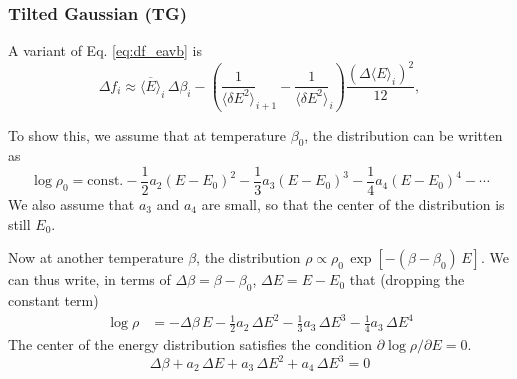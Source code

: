 \documentclass[aip,jcp,preprint,notitlepage, superscriptaddress]{revtex4-1}
\begin{document}
\subsubsection{Tilted Gaussian (TG)}



A variant of Eq. \eqref{eq:df_eavb} is
\begin{equation}
\Delta f_i
\approx
\overline{ \langle E \rangle }_i \, \Delta \beta_i
-
\left(
  \frac 1 { \langle \delta E^2 \rangle }_{i+1}
  -
  \frac 1 { \langle \delta E^2 \rangle }_{i}
\right)
\frac{ \left( \Delta \langle E \rangle_i \right)^2 }{ 12 },
\label{eq:df_tgaus}
\end{equation}



To show this,
we assume that at temperature $\beta_0$,
the distribution can be written as
%
\begin{equation}
\log \rho_0
=
\mathrm{const.}
-\frac{1}{2} a_2 (E - E_0)^2
-\frac{1}{3} a_3 (E - E_0)^3
-\frac{1}{4} a_4 (E - E_0)^4
-\cdots
\end{equation}
%
We also assume that
$a_3$ and $a_4$ are small,
so that the center of the distribution is still $E_0$.



Now at another temperature $\beta$,
the distribution
$\rho \propto \rho_0 \, \exp[-(\beta - \beta_0) \, E]$.
%
We can thus write,
in terms of $\Delta \beta = \beta - \beta_0$,
$\Delta E = E - E_0$ that (dropping the constant term)
%
\begin{align*}
\log \rho
&=
-\Delta \beta \, E
-\frac{1}{2} a_2 \, \Delta E^2
-\frac{1}{3} a_3 \, \Delta E^3
-\frac{1}{4} a_3 \, \Delta E^4
\end{align*}
%
The center of the energy distribution
satisfies the condition
$\partial \log \rho/\partial E = 0$.
%
\begin{equation}
  \Delta \beta
+a_2 \, \Delta E
+a_3 \, \Delta E^2
+a_4 \, \Delta E^3
= 0
\label{eq:TG_betaE}
\end{equation}
\end{document}
